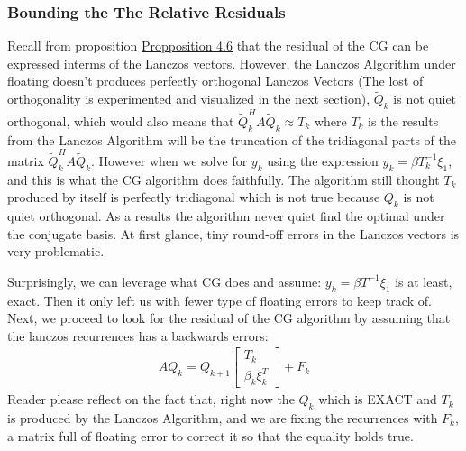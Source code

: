 \documentclass[]{article}
\theoremstyle{definition}
\begin{document}
        \subsubsection{Bounding the The Relative Residuals}
            Recall from proposition \hyperref[prop:Lanczos_Vectors_and_Residuals]{Propposition 4.6} that the residual of the CG can be expressed interms of the Lanczos vectors. However, the Lanczos Algorithm under floating doesn't produces perfectly orthogonal Lanczos Vectors (The lost of orthogonality is experimented and visualized in the next section), $\tilde{Q}_k$ is not quiet orthogonal, which would also means that $\tilde{Q}_k^HA\tilde{Q}_k\approx T_k$ where $T_k$ is the results from the Lanczos Algorithm will be the truncation of the tridiagonal parts of the matrix $\tilde{Q}_k^HA\tilde{Q}_k$. However when we solve for $y_k$ using the expression $y_k = \beta T^{-1}_k\xi_1$, and this is what the CG algorithm does faithfully. The algorithm still thought $T_k$ produced by itself is perfectly tridiagonal which is not true because $Q_k$ is not quiet orthogonal. As a results the algorithm never quiet find the optimal under the conjugate basis. At first glance, tiny round-off errors in the Lanczos vectors is very problematic. 
            \par
            Surprisingly, we can leverage what CG does and assume: $y_k = \beta T^{-1}\xi_1$ is at least, exact. Then it only left us with fewer type of floating errors to keep track of. Next, we proceed to look for the residual of the CG algorithm by assuming that the lanczos recurrences has a backwards errors: 
            \begin{align}
                AQ_k = Q_{k + 1} \begin{bmatrix}
                    T_k
                    \\
                    \beta_k \xi_k^T
                \end{bmatrix} + F_k
            \end{align}
            Reader please reflect on the fact that, right now the $Q_k$ which is EXACT and $T_k$ is produced by the Lanczos Algorithm, and we are fixing the recurrences with $F_k$, a matrix full of floating error to correct it so that the equality holds true. 
\end{document}
